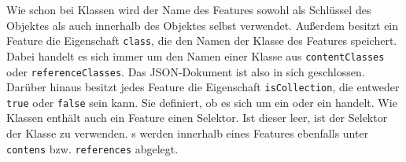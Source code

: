     

    Wie schon bei Klassen wird der Name des Features sowohl als Schlüssel des Objektes
    als auch innerhalb des Objektes selbst verwendet.
    Außerdem besitzt ein Feature die Eigenschaft \texttt{class},
    die den Namen der Klasse des Features speichert. Dabei handelt es sich immer
    um den Namen einer Klasse aus \texttt{contentClasses} oder \texttt{referenceClasses}.
    Das JSON-Dokument ist also in sich geschlossen.
    Darüber hinaus besitzt jedes Feature die Eigenschaft \texttt{isCollection},
    die entweder \texttt{true} oder \texttt{false} sein kann.
    Sie definiert,
    ob es sich um ein {\scalarFeature} oder ein {\collectionFeature} handelt.
    Wie Klassen enthält auch ein Feature einen Selektor.
    Ist dieser leer, ist der Selektor der Klasse zu verwenden.
    {\childFeature}s werden innerhalb eines Features ebenfalls unter \texttt{contens} bzw.
    \texttt{references} abgelegt.